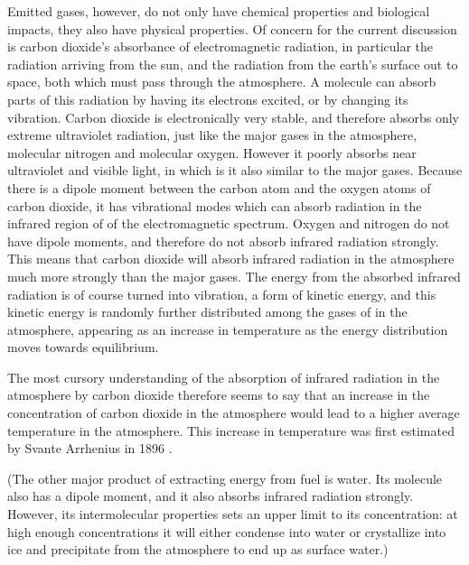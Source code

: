 Emitted gases, however, do not only have chemical properties and biological
impacts, they also have physical properties. Of concern for the current
discussion is carbon dioxide's absorbance of electromagnetic radiation, in
particular the radiation arriving from the sun, and the radiation from the
earth's surface out to space, both which must pass through the atmosphere. A
molecule can absorb parts of this radiation by having its electrons excited, or
by changing its vibration. Carbon dioxide is electronically very stable, and
therefore absorbs only extreme ultraviolet radiation, just like the major gases
in the atmosphere, molecular nitrogen and molecular oxygen. However it poorly
absorbs near ultraviolet and visible light, in which is it also similar to the
major gases. Because there is a dipole moment between the carbon atom and the
oxygen atoms of carbon dioxide, it has vibrational modes which can absorb
radiation in the infrared region of of the electromagnetic spectrum. Oxygen and
nitrogen do not have dipole moments, and therefore do not absorb infrared
radiation strongly. This means that carbon dioxide will absorb infrared
radiation in the atmosphere much more strongly than the major gases. The energy
from the absorbed infrared radiation is of course turned into vibration, a form
of kinetic energy, and this kinetic energy is randomly further distributed among
the gases of in the atmosphere, appearing as an increase in temperature as the
energy distribution moves towards equilibrium.

The most cursory understanding of the absorption of infrared radiation in the
atmosphere by carbon dioxide therefore seems to say that an increase in the
concentration of carbon dioxide in the atmosphere would lead to a higher average
temperature in the atmosphere. This increase in temperature was first estimated
by Svante Arrhenius in 1896 \autocite{Arrhenius1897}.

(The other major product of extracting energy from fuel is water. Its molecule
also has a dipole moment, and it also absorbs infrared radiation strongly.
However, its intermolecular properties sets an upper limit to its concentration:
at high enough concentrations it will either condense into water or crystallize
into ice and precipitate from the atmosphere to end up as surface water.)

